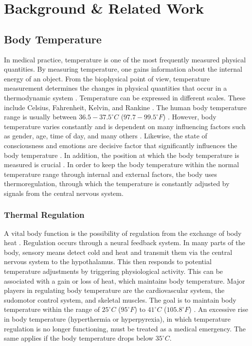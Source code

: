 
\chapter{Background \& Related Work}
\label{ch:Background}

\section{Body Temperature}
In medical practice, temperature is one of the most frequently measured physical quantities.
By measuring temperature, one gains information about the internal energy of an object.
From the biophysical point of view, temperature measurement determines the changes in physical quantities that occur in a thermodynamic system \cite{dolibogComparativeAnalysisHuman2022}.
Temperature can be expressed in different scales.
These include Celsius, Fahrenheit, Kelvin, and Rankine \cite{grodzinskyUnderstandingFeverBody2020}.
The human body temperature range is usually between $36.5-37.5^\circ C$ ($97.7-99.5^\circ F$) \cite{hutchisonHypothermiaTherapyTraumatic2008}.
However, body temperature varies constantly and is dependent on many influencing factors such as gender, age, time of day, and many others \cite{sund-levanderNormalOralRectal2002}.
Likewise, the state of consciousness and emotions are decisive factor that significantly influences the body temperature \cite{barbosaescobarTemperatureEmotions2021}.
In addition, the position at which the body temperature is measured is crucial \cite{Physiologie9783137960072ZVAB}.
In order to keep the body temperature within the normal temperature range through internal and external factors, the body uses thermoregulation, through which the temperature is constantly adjusted by signals from the central nervous system.

\subsection{Thermal Regulation}
A vital body function is the possibility of regulation from the exchange of body heat \cite{grodzinskyUnderstandingFeverBody2020}.
Regulation occurs through a neural feedback system. 
In many parts of the body, sensory means detect cold and heat and transmit them via the central nervous system to the hypothalamus.
This then responds to potential temperature adjustments by triggering physiological activity. 
This can be associated with a gain or loss of heat, which maintains body temperature.
Major players in regulating body temperature are the cardiovascular system, the sudomotor control system, and skeletal muscles. 
The goal is to maintain body temperature within the range of $25^\circ C$ ($95^\circ F$) to $41^\circ C$ ($105.8^\circ F$) \cite{pierauTemperatursensibilitaet2001}. 
An excessive rise in body temperature (hyperthermia or hyperpyrexia), in which temperature regulation is no longer functioning, must be treated as a medical emergency.
The same applies if the body temperature drops below $35^\circ C$.

